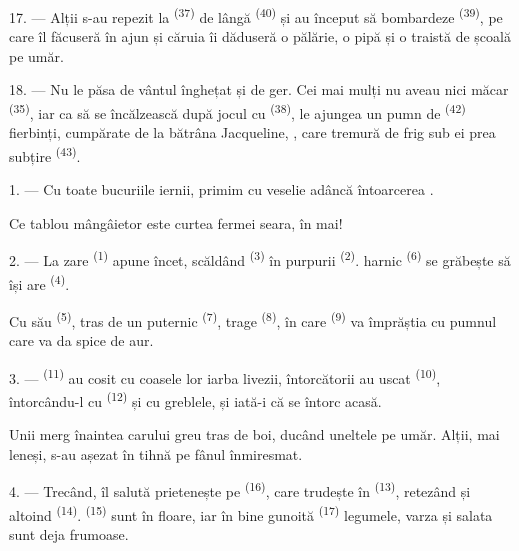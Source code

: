 17. --- Alții s-au repezit la  \textsuperscript{(37)} de lângă
 \textsuperscript{(40)} și au început să bombardeze  \textsuperscript{(39)}, pe care îl făcuseră în ajun și căruia îi dăduseră
o pălărie, o pipă și o traistă de școală pe umăr.

18. --- Nu le păsa de vântul înghețat și de ger. Cei mai mulți nu aveau nici măcar
 \textsuperscript{(35)}, iar ca să se încălzească după jocul cu
 \textsuperscript{(38)}, le ajungea un pumn de
 \textsuperscript{(42)} fierbinți, cumpărate de la bătrâna
Jacqueline, , care tremură de frig sub  ei prea
subțire \textsuperscript{(43)}.

\VUsaut{3.0mm}
\VUsaut{3.0mm}

\VUsaut{4.0mm}

1. --- Cu toate bucuriile iernii, primim cu veselie adâncă întoarcerea
.

Ce tablou mângâietor este curtea fermei seara, în mai!

2. --- La zare  \textsuperscript{(1)} apune încet, scăldând
 \textsuperscript{(3)} în  purpurii
\textsuperscript{(2)}.  harnic \textsuperscript{(6)} se grăbește
să își are  \textsuperscript{(4)}.

Cu  său \textsuperscript{(5)}, tras de un  puternic
\textsuperscript{(7)}, trage  \textsuperscript{(8)}, în care
 \textsuperscript{(9)} va împrăștia cu pumnul 
care va da spice de aur.

3. ---  \textsuperscript{(11)} au cosit cu coasele lor iarba
livezii, întorcătorii au uscat  \textsuperscript{(10)},
întorcându-l cu  \textsuperscript{(12)} și cu greblele, și iată-i
că se întorc acasă.

Unii merg înaintea carului greu tras de boi, ducând uneltele pe umăr. Alții, mai
leneși, s-au așezat în tihnă pe fânul înmiresmat.

4. --- Trecând, îl salută prietenește pe 
\textsuperscript{(16)}, care trudește în  \textsuperscript{(13)},
retezând  și altoind  \textsuperscript{(14)}.
 \textsuperscript{(15)} sunt în floare, iar în  bine gunoită \textsuperscript{(17)} legumele, varza și salata sunt deja
frumoase.

